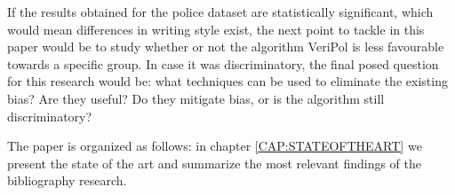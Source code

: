 If the results obtained for the police dataset are statistically significant, which would mean differences in writing style exist, the next point to tackle in this paper would be to study whether or not the algorithm VeriPol is less favourable towards a specific group. In case it was discriminatory, the final posed question for this research would be: what techniques can be used to eliminate the existing bias? Are they useful? Do they mitigate bias, or is the algorithm still discriminatory?

The paper is organized as follows: in chapter \ref{CAP:STATEOFTHEART} we present the state of the art and summarize the most relevant findings of the bibliography research. 